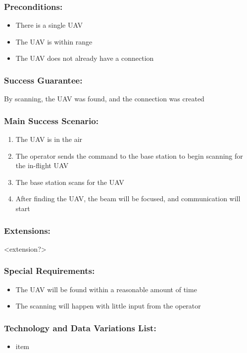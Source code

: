 \documentclass[ProductRequirements.tex]{subfiles}
\begin{document}
		\subsubsection*{Preconditions:}
			\begin{itemize}\itemsep1pt
				\item There is a single UAV
				\item The UAV is within range
				\item The UAV does not already have a connection
			\end{itemize}
		\subsubsection*{Success Guarantee:}
			By scanning, the UAV was found, and the connection was created
		\subsubsection*{Main Success Scenario:}
			\begin{enumerate}\itemsep1pt
				\item The UAV is in the air
				\item The operator sends the command to the base station to begin scanning for the in-flight UAV
				\item The base station scans for the UAV
				\item After finding the UAV, the beam will be focused, and communication will start
			\end{enumerate}
		\subsubsection*{Extensions:}
			<extension?>
		\subsubsection*{Special Requirements:}
			\begin{itemize}\itemsep1pt
				\item The UAV will be found within a reasonable amount of time
				\item The scanning will happen with little input from the operator
			\end{itemize}
		\subsubsection*{Technology and Data Variations List:}
			\begin{itemize}\itemsep1pt
				\item item
			\end{itemize}
\end{document}
